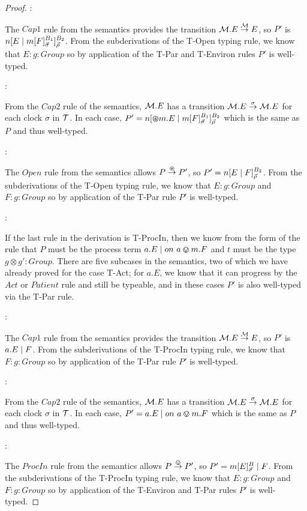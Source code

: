 \begin{proof}
:

\noindent The $Cap1$ rule from the semantics provides the transition
$\text{$\mathcal{M}$}.E \stackrel{\text{$\mathcal{M}$}}{\rightarrow} E$, so $P'$ is ${n}[ E \;|\;
  {m}[ F ]^{B_1}_{\vec{\sigma}} ]^{B_2}_{\vec{\rho}}$.  From the
subderivations of the T-Open typing rule, we know that $E : g : Group$
so by application of the T-Par and T-Environ rules $P'$ is well-typed.

:

\noindent From the $Cap2$ rule of the semantics, $\text{$\mathcal{M}$}.E$ has a
transition $\text{$\mathcal{M}$}.E \stackrel{\sigma}{\rightarrow} \text{$\mathcal{M}$}.E$ for each clock
$\sigma$ in $\text{$\mathcal{T}$}$.  In each case, $P' = {n}[ \varoast m.E \;|\;
  {m}[ F ]^{B_1}_{\vec{\sigma}} ]^{B_2}_{\vec{\rho}}$ which is the same
as $P$ and thus well-typed.

:

\noindent The $Open$ rule from the semantics allows $P
\stackrel{\varoast}{\rightarrow} P'$, so $P' = {n}[ E \;|\; F ]^{B_2}_{\vec{\rho}}$.
From the subderivations of the T-Open typing rule, we know that $E : g
: Group$ and $F : g : Group$ so by application of the T-Par rule $P'$
is well-typed.

:

\noindent If the last rule in the derivation is T-ProcIn, then we know
from the form of the rule that $P$ must be the process term $a.E \;|\;
on\ a \varovee m.F$ and $t$ must be the type $g \otimes g': Group$.
There are five subcases in the semantics, two of which we have already
proved for the case T-Act; for $a.E$, we know that it can progress by
the $Act$ or $Patient$ rule and still be typeable, and in these cases
$P'$ is also well-typed via the T-Par rule.

:

\noindent The $Cap1$ rule from the semantics provides the transition
$\text{$\mathcal{M}$}.E \stackrel{\text{$\mathcal{M}$}}{\rightarrow} E$, so $P'$ is $a.E \;|\; F$.  From the
subderivations of the T-ProcIn typing rule, we know that $F : g : Group$
so by application of the T-Par rule $P'$ is well-typed.

:

\noindent From the $Cap2$ rule of the semantics, $\text{$\mathcal{M}$}.E$ has a
transition $\text{$\mathcal{M}$}.E \stackrel{\sigma}{\rightarrow} \text{$\mathcal{M}$}.E$ for each clock
$\sigma$ in $\text{$\mathcal{T}$}$.  In each case, $P' = a.E \;|\; on\ a \varovee m.F$
which is the same as $P$ and thus well-typed.

:

\noindent The $ProcIn$ rule from the semantics allows $P
\stackrel{\varovee}{\rightarrow} P'$, so $P' = {m}[ E ]^{B}_{\vec{\sigma}} \;|\; F$.
From the subderivations of the T-ProcIn typing rule, we know that $E :
g : Group$ and $F : g : Group$ so by application of the T-Environ and
T-Par rules $P'$ is well-typed.


\end{proof}

